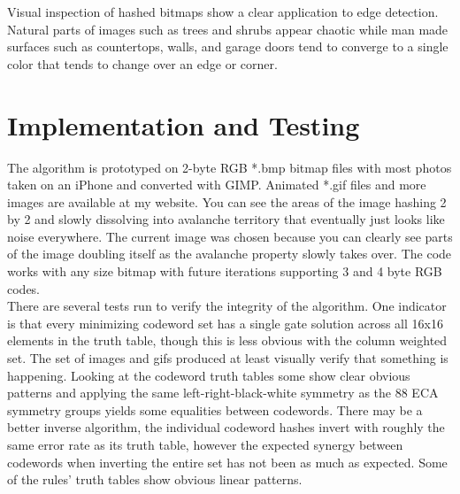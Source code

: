 \documentclass[11pt]{article}
\begin{document}
Visual inspection of hashed bitmaps show a clear application to edge detection. Natural parts of images such as trees and shrubs appear chaotic while man made surfaces such as countertops, walls, and garage doors tend to converge to a single color that tends to change over an edge or corner.

\section{Implementation and Testing}

The algorithm is prototyped on 2-byte RGB *.bmp bitmap files with most photos taken on an iPhone and converted with GIMP. Animated *.gif files and more images are available at my website. You can see the areas of the image hashing 2 by 2 and slowly dissolving into avalanche territory that eventually just looks like noise everywhere. The current image was chosen because you can clearly see parts of the image doubling itself as the avalanche property slowly takes over. The code works with any size bitmap with future iterations supporting 3 and 4 byte RGB codes. \\

There are several tests run to verify the integrity of the algorithm. One indicator is that every minimizing codeword set has a single gate solution across all 16x16 elements in the truth table, though this is less obvious with the column weighted set. The set of images and gifs produced at least visually verify that something is happening. Looking at the codeword truth tables some show clear obvious patterns and applying the same left-right-black-white symmetry as the 88 ECA symmetry groups \cite{Wolfram} yields some equalities between codewords. There may be a better inverse algorithm, the individual codeword hashes invert with roughly the same error rate as its truth table, however the expected synergy between codewords when inverting the entire set has not been as much as expected. Some of the rules' truth tables show obvious linear patterns. \\
\end{document}
